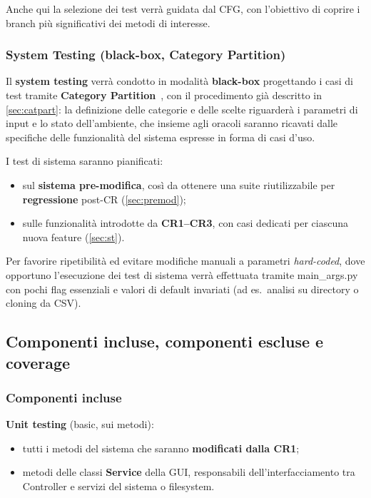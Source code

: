 \documentclass[11pt,a4paper]{article}
\makeatletter
\newif\ifmark@prevlower
\def\mark@casebreak#1{%
  \ifcat\noexpand#1\relax
    \mark@prevlowerfalse
  \else
    \ifnum`#1=\uccode`#1\relax
      \ifmark@prevlower\allowbreak\fi
      \mark@prevlowerfalse
    \else
      \ifnum`#1=\lccode`#1\relax
        \mark@prevlowertrue
      \else
        \mark@prevlowerfalse
      \fi
    \fi
  \fi}
\def\mark@brk#1{%
  \ifx#1\mark@stop
    \let\mark@next\relax
  \else
    \mark@casebreak{#1}%
    #1%
    \ifx#1.\allowbreak\else
      \ifx#1\_\allowbreak\else
        \ifx#1/\allowbreak\else
          \ifx#1(\allowbreak\fi
        \fi
      \fi
    \fi
    \let\mark@next\mark@brk
  \fi
  \mark@next}
\def\mark@stop{\mark@stop}
\DeclareRobustCommand{\mark@code}[1]{%
  \ifmmode
    \text{\ttfamily\small\mark@prevlowerfalse\mark@brk#1\mark@stop}%
  \else
    {\ttfamily\small\mark@prevlowerfalse\mark@brk#1\mark@stop}%
  \fi}
\DeclareRobustCommand{\file}[1]{\mark@code{#1}}
\def\mark@code#1{#1}%
\def\file#1{#1}%
\makeatother
\begin{document}
Anche qui la selezione dei test verr\`a guidata dal CFG, con l'obiettivo di
coprire i branch pi\`u significativi dei metodi di interesse.

\subsubsection{System Testing (black-box, Category Partition)}
\label{sec:mtp-system}

Il \textbf{system testing} verr\`a condotto in modalit\`a \textbf{black-box}
progettando i casi di test tramite \textbf{Category
Partition}~\cite{ostrandbalcer}, con il procedimento gi\`a descritto in
\cref{sec:catpart}: la definizione delle categorie e delle scelte riguarder\`a i
parametri di input e lo stato dell'ambiente, che insieme agli oracoli saranno
ricavati dalle specifiche delle funzionalit\`a del sistema espresse in forma di
casi d'uso.

I test di sistema saranno pianificati:

\begin{itemize}[nosep]
  \item sul \textbf{sistema pre-modifica}, cos\`i da ottenere una suite
    riutilizzabile per \textbf{regressione} post-CR (\cref{sec:premod});
  \item sulle funzionalit\`a introdotte da \textbf{CR1--CR3}, con casi dedicati
    per ciascuna nuova feature (\cref{sec:st}).
\end{itemize}

Per favorire ripetibilit\`a ed evitare modifiche manuali a parametri
\emph{hard-coded}, dove opportuno l'esecuzione dei test di sistema verr\`a
effettuata tramite \file{main\_args.py} con pochi flag essenziali e valori di
default invariati (ad es.\ analisi su directory o cloning da CSV).

\subsection{Componenti incluse, componenti escluse e coverage}
\label{sec:mtp-componenti}

\subsubsection{Componenti incluse}
\label{sec:mtp-incluse}

\textbf{Unit testing} (basic, sui metodi):

\begin{itemize}[nosep]
  \item tutti i metodi del sistema che saranno \textbf{modificati dalla CR1};
  \item metodi delle classi \textbf{Service} della GUI, responsabili
    dell'interfacciamento tra Controller e servizi del sistema o filesystem.
\end{itemize}
\end{document}
